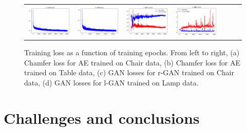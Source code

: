 \documentclass[12pt]{article}
\newcommand{\contentdescription}[1]{}
\begin{document}
    \begin{figure}
        \centering
        \begin{tabular}{lllllll}
            \includegraphics[width = 30mm]{chair_l_gan_curves} &
            \includegraphics[width = 30mm]{table_l_gan_curves} &
            \includegraphics[width = 30mm]{chair_raw_gan_curves} &
            \includegraphics[width = 30mm]{lamp_raw_gan_curves} \\
        \end{tabular}
        \caption{Training loss as a function of training epochs. From left to right, (a) Chamfer loss for AE trained on Chair data, (b) Chamfer loss for AE trained on Table data, (c) GAN losses for r-GAN trained on Chair data, (d) GAN losses for l-GAN trained on Lamp data.}
        \label{figure:curves_for_latent_gan_and_raw_gan}
    \end{figure}


    \section{Challenges and conclusions}
    \label{sec:conclusions}
    \contentdescription{
        Challenges and Conclusions (5-15\%):
        Challenges you faced when reimplementing the paper and conducting the experiments.
        Were all details in the paper?
        Or did you have to look in the authors code or even contact them to find about some details?
        Was parts of the code quite hard to get them to work as intended?
        Did you have optimize and tune several hyperparameters?
        Which ones?
        Did the framework you used make the implementation difficult in some ways?

        Summarize your key results - what have you learned?
        What points do you think one should consider when using the approach of the paper you chose for your project?
        Suggest ideas for future extensions or new applications of your ideas.
    }
\end{document}
